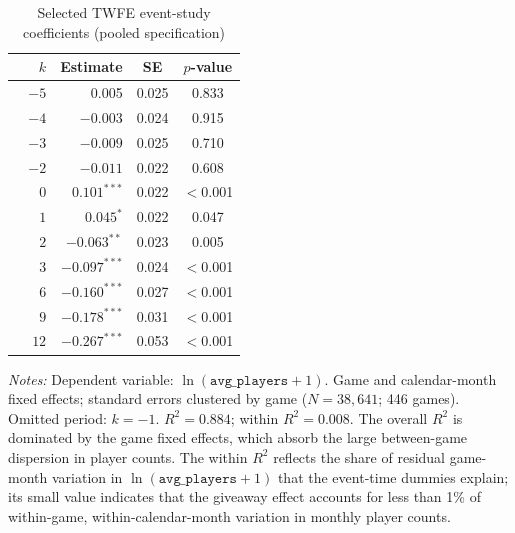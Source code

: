\documentclass[11pt]{article}
\begin{document}
\vspace{2em}

\begin{table}[H]
\centering\small
\caption{Selected TWFE event-study coefficients (pooled specification)}
\label{tab:coefs}
\begin{tabular}{rrcc}
\toprule
$k$ & Estimate & SE & $p$-value \\
\midrule
$-5$ &  0.005 & 0.025 & 0.833 \\
$-4$ & $-0.003$ & 0.024 & 0.915 \\
$-3$ & $-0.009$ & 0.025 & 0.710 \\
$-2$ & $-0.011$ & 0.022 & 0.608 \\
\midrule
$\phantom{-}0$ & $\mathbf{0.101}^{***}$ & 0.022 & $<$0.001 \\
$\phantom{-}1$ & $0.045^{*}$ & 0.022 & 0.047 \\
$\phantom{-}2$ & $-0.063^{**}$ & 0.023 & 0.005 \\
$\phantom{-}3$ & $-0.097^{***}$ & 0.024 & $<$0.001 \\
$\phantom{-}6$ & $-0.160^{***}$ & 0.027 & $<$0.001 \\
$\phantom{-}9$ & $-0.178^{***}$ & 0.031 & $<$0.001 \\
$\phantom{-}12$ & $-0.267^{***}$ & 0.053 & $<$0.001 \\
\bottomrule
\end{tabular}
\medskip

\noindent\small\textit{Notes:} Dependent variable: $\ln(\texttt{avg\_players}+1)$.
Game and calendar-month fixed effects; standard errors clustered
by game ($N = 38{,}641$; 446 games). Omitted period: $k = -1$.
$R^2 = 0.884$; within $R^2 = 0.008$. The overall $R^2$ is dominated by the
game fixed effects, which absorb the large between-game dispersion in player
counts. The within $R^2$ reflects the share of residual game-month variation
in $\ln(\texttt{avg\_players}+1)$ 
that the event-time dummies explain; its small value indicates
that the giveaway effect
accounts for less than 1\% of within-game, within-calendar-month
variation in monthly player counts.
\end{table}

\vspace{2em}
\end{document}
